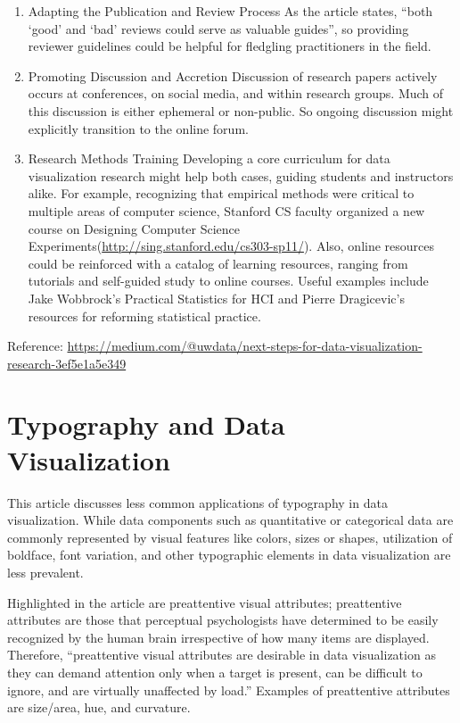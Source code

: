 \documentclass[]{book}
\theoremstyle{definition}
\theoremstyle{definition}
\theoremstyle{definition}
\theoremstyle{remark}
\begin{document}
\begin{enumerate}
\def\labelenumi{\arabic{enumi}.}
\item
  Adapting the Publication and Review Process As the article states,
  ``both `good' and `bad' reviews could serve as valuable guides'', so
  providing reviewer guidelines could be helpful for fledgling
  practitioners in the field.
\item
  Promoting Discussion and Accretion Discussion of research papers
  actively occurs at conferences, on social media, and within research
  groups. Much of this discussion is either ephemeral or non-public. So
  ongoing discussion might explicitly transition to the online forum.
\item
  Research Methods Training Developing a core curriculum for data
  visualization research might help both cases, guiding students and
  instructors alike. For example, recognizing that empirical methods
  were critical to multiple areas of computer science, Stanford CS
  faculty organized a new course on Designing Computer Science
  Experiments(\url{http://sing.stanford.edu/cs303-sp11/}). Also, online
  resources could be reinforced with a catalog of learning resources,
  ranging from tutorials and self-guided study to online courses. Useful
  examples include Jake Wobbrock's Practical Statistics for HCI and
  Pierre Dragicevic's resources for reforming statistical practice.
\end{enumerate}

Reference:
\url{https://medium.com/@uwdata/next-steps-for-data-visualization-research-3ef5e1a5e349}

\section{Typography and Data
Visualization}\label{typography-and-data-visualization}

This article discusses less common applications of typography in data
visualization. While data components such as quantitative or categorical
data are commonly represented by visual features like colors, sizes or
shapes, utilization of boldface, font variation, and other typographic
elements in data visualization are less prevalent.

Highlighted in the article are preattentive visual attributes;
preattentive attributes are those that perceptual psychologists have
determined to be easily recognized by the human brain irrespective of
how many items are displayed. Therefore, ``preattentive visual
attributes are desirable in data visualization as they can demand
attention only when a target is present, can be difficult to ignore, and
are virtually unaffected by load.'' Examples of preattentive attributes
are size/area, hue, and curvature.
\end{document}
